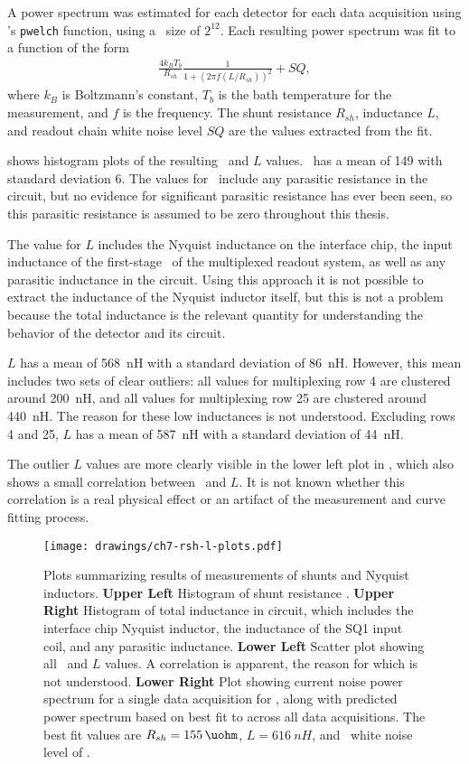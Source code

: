 A power spectrum was estimated for each detector for each data acquisition using \MATLAB's \texttt{pwelch} function, using a \FFT\ size of $2^{12}$.
Each resulting power spectrum was fit to a function of the form
\begin{eqnarray}\label{eqn:scnoise-fit}
	\frac{4 k_B T_b}{R_{sh}} \frac{1}{1 + (2 \pi f (L/R_{sh}))^2} + SQ,
\end{eqnarray}
where $k_B$ is Boltzmann's constant, $T_b$ is the bath temperature for the measurement, and $f$ is the frequency.
The shunt resistance $R_{sh}$, inductance $L$, and readout chain white noise level $SQ$ are the values extracted from the fit.

 shows histogram plots of the resulting \Rsh\ and $L$ values.
\Rsh\ has a mean of \SI{149}{\uohm} with standard deviation \SI{6}{\uohm}.
The values for \Rsh\ include any parasitic resistance in the circuit, but no evidence for significant parasitic resistance has ever been seen, so this parasitic resistance is assumed to be zero throughout this thesis.

The value for $L$ includes the Nyquist inductance on the interface chip, the input inductance of the first-stage \SQUID\ of the multiplexed readout system, as well as any parasitic inductance in the circuit.
Using this approach it is not possible to extract the inductance of the Nyquist inductor itself, but this is not a problem because the total inductance is the relevant  quantity for understanding the behavior of the detector and its circuit.

$L$ has a mean of 568~nH with a standard deviation of 86~nH.
However, this mean includes two sets of clear outliers: all values for multiplexing row 4 are clustered around 200~nH, and all values for multiplexing row 25 are clustered around 440~nH.
The reason for these low inductances is not understood.
Excluding rows 4 and 25,  $L$ has a mean of 587~nH with a standard deviation of 44~nH.

The outlier $L$ values are more clearly visible in the lower left plot in , which also shows a small correlation between \Rsh\ and $L$.
It is not known whether this correlation is a real physical effect or an artifact of the measurement and curve fitting process.

\begin{figure*}
\texttt{[image: drawings/ch7-rsh-l-plots.pdf]}
\caption{Plots summarizing results of measurements of shunts and Nyquist inductors.
\textbf{Upper Left} Histogram of shunt resistance \Rsh.
\textbf{Upper Right} Histogram of total inductance in circuit, which includes the interface chip Nyquist inductor, the inductance of the SQ1 input coil, and any parasitic inductance.
\textbf{Lower Left} Scatter plot showing all \Rsh\ and $L$ values. A correlation is apparent, the reason for which is not understood.
\textbf{Lower Right} Plot showing current noise power spectrum for a single data acquisition for , along with predicted power spectrum based on best fit to  across all data acquisitions. The best fit values are $\Rsh=\SI{155}{\uohm}$, $L = \SI{616}{nH}$, and \SQUID\ white noise level of .}
\label{fig:rsh-l-plots}
\end{figure*}

